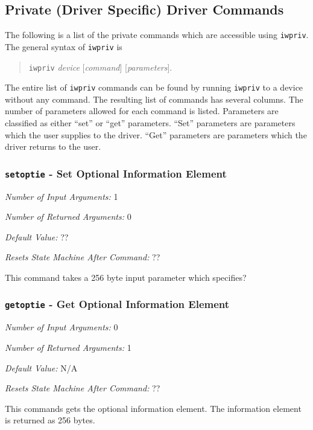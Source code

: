 \documentclass[10pt,fullpage]{article}
\newcommand{\mytt}[1]{{\texttt{#1}}}
\newcommand{\bv}{\begin{verse}}
\newcommand{\ev}{\end{verse}}
\newcommand{\argdesc}[4]{\begin{description}
\itemsep -6pt
\item \textit{Number of Input Arguments:} #1
\item \textit{Number of Returned Arguments:} #2
\item \textit{Default Value:} #3
\item \textit{Resets State Machine After Command:} #4
\end{description}
}
\begin{document}
\subsection{Private (Driver Specific) Driver Commands}
\label{sec:iwprivs}
The following is a list of the private commands which are accessible
using \mytt{iwpriv}.  The general syntax of \mytt{iwpriv} is
\bv
\mytt{iwpriv} \textit{device} [\textit{command}]
[\textit{parameters}].
\ev
The entire list of \mytt{iwpriv} commands can be found by running
\mytt{iwpriv} to a device without any command.  The resulting list of
commands has several columns.  The number of parameters allowed for
each command is listed.  Parameters are classified as either ``set''
or ``get'' parameters.  ``Set'' parameters are parameters which the
user supplies to the driver.  ``Get'' parameters are parameters which
the driver returns to the user.

\subsubsection{\mytt{setoptie} - Set Optional Information Element}
\argdesc{1}{0}{??}{??}
This command takes a 256 byte input parameter which specifies?

\subsubsection{\mytt{getoptie} - Get Optional Information Element}
\argdesc{0}{1}{N/A}{??}
This commands gets the optional information element.  The information
element is returned as 256 bytes.
\end{document}
